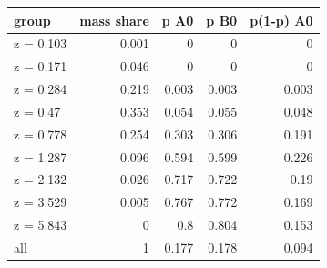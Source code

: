 \begin{tabular}{lrrrr}
\toprule
group & mass share & p A0 & p B0 & p(1-p) A0 \\
\midrule
z = 0.103 & 0.001 & 0 & 0 & 0 \\
z = 0.171 & 0.046 & 0 & 0 & 0 \\
z = 0.284 & 0.219 & 0.003 & 0.003 & 0.003 \\
z = 0.47 & 0.353 & 0.054 & 0.055 & 0.048 \\
z = 0.778 & 0.254 & 0.303 & 0.306 & 0.191 \\
z = 1.287 & 0.096 & 0.594 & 0.599 & 0.226 \\
z = 2.132 & 0.026 & 0.717 & 0.722 & 0.19 \\
z = 3.529 & 0.005 & 0.767 & 0.772 & 0.169 \\
z = 5.843 & 0 & 0.8 & 0.804 & 0.153 \\
all & 1 & 0.177 & 0.178 & 0.094 \\
\bottomrule
\end{tabular}
